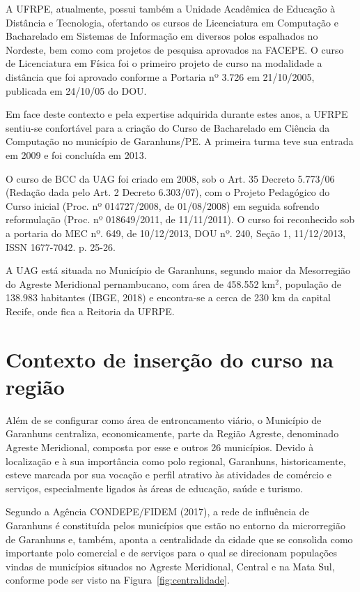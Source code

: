 \documentclass[
	12pt,				%
	openright,			%
  oneside,     %
	a4paper,			%
	chapter=TITLE,		%
	english,			%
	french,				%
	spanish,			%
	brazil				%
	]{abntex2}
\begin{document}
A UFRPE, atualmente, possui também a Unidade Acadêmica de Educação à Distância e Tecnologia, ofertando os cursos de Licenciatura em Computação e Bacharelado em Sistemas de Informação em diversos polos espalhados no Nordeste, bem como com projetos de pesquisa aprovados na FACEPE. O curso de Licenciatura em Física foi o primeiro projeto de curso na modalidade a distância que foi aprovado conforme a Portaria nº 3.726 em 21/10/2005, publicada em 24/10/05 do DOU.

Em face deste contexto e pela expertise adquirida durante estes anos, a UFRPE sentiu-se confortável para a criação do Curso de Bacharelado em Ciência da Computação no município de Garanhuns/PE. A primeira turma teve sua entrada em 2009 e foi concluída em 2013. 

O curso de BCC da UAG foi criado em 2008, sob o Art. 35 Decreto 5.773/06 (Redação dada pelo Art. 2 Decreto 6.303/07), com o Projeto Pedagógico do Curso inicial (Proc. nº 014727/2008, de 01/08/2008) em seguida sofrendo reformulação (Proc. nº 018649/2011, de 11/11/2011). O curso foi reconhecido sob a portaria do MEC nº. 649, de 10/12/2013, DOU nº. 240, Seção 1, 11/12/2013, ISSN 1677-7042. p. 25-26.

A UAG está situada no Município de Garanhuns, segundo maior da Mesorregião do Agreste Meridional pernambucano, com área de 458.552 km$^2$, população de 138.983 habitantes (IBGE, 2018) e encontra-se a cerca de 230 km da capital Recife, onde fica a Reitoria da UFRPE.

\section{Contexto de inserção do curso na região}

Além de se configurar como área de entroncamento viário, o Município de Garanhuns centraliza, economicamente, parte da Região Agreste, denominado Agreste Meridional, composta por esse e outros 26 municípios. Devido à  localização  e  à  sua  importância como polo regional, Garanhuns, historicamente, esteve marcada por sua vocação e perfil atrativo às atividades de comércio e serviços, especialmente ligados às áreas de educação, saúde e turismo.

Segundo a Agência CONDEPE/FIDEM (2017), a rede de influência de Garanhuns é constituída pelos municípios que estão no entorno da microrregião de Garanhuns e, também, aponta a centralidade da cidade que se consolida como importante polo comercial e de serviços para o qual se direcionam populações vindas de municípios situados no Agreste Meridional, Central e na Mata Sul, conforme pode ser visto na Figura~\ref{fig:centralidade}.
\end{document}
